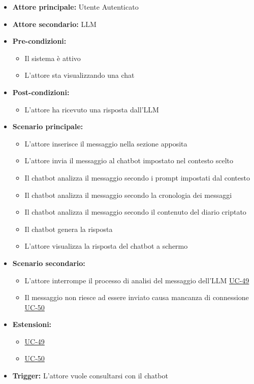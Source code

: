 \documentclass[a4paper,12pt]{article}
\newcommand{\ignoreglossary}{}
\begin{document}
\begin{itemize}
    \item \textbf{Attore principale:} Utente Autenticato
    \item \textbf{Attore secondario:} LLM
    \item \textbf{Pre-condizioni:}
    \begin{itemize}
        \item Il sistema è attivo
        \item L'attore sta visualizzando una chat
    \end{itemize}
    \item \textbf{Post-condizioni:}
    \begin{itemize}
        \item L'attore ha ricevuto una risposta dall'LLM
    \end{itemize}
    \item \textbf{Scenario principale:} 
    \begin{itemize}
        \item L'attore inserisce il messaggio nella sezione apposita
        \item L'attore invia il messaggio al chatbot impostato nel contesto scelto
        \item Il chatbot analizza il messaggio secondo i prompt impostati dal contesto
        \item Il chatbot analizza il messaggio secondo la cronologia dei messaggi
        \item Il chatbot analizza il messaggio secondo il contenuto del diario criptato
        \item Il chatbot genera la risposta
        \item L'attore visualizza la risposta del chatbot a schermo
    \end{itemize}
    \item \textbf{Scenario secondario:} 
    \begin{itemize}
        \item L'attore interrompe il \ignoreglossary{processo} di analisi del messaggio dell'LLM \hyperref[sec:UC-49]{UC-49}
        \item Il messaggio non riesce ad essere inviato causa mancanza di connessione \hyperref[sec:UC-50]{UC-50}
    \end{itemize}
    \item \textbf{Estensioni:}
    \begin{itemize}
        \item \hyperref[sec:UC-49]{UC-49}
        \item \hyperref[sec:UC-50]{UC-50}
    \end{itemize}
    \item \textbf{Trigger:} L'attore vuole consultarsi con il chatbot
\end{itemize}
\end{document}
